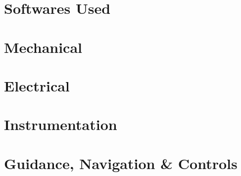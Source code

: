 \section{Softwares Used}
\thispagestyle{fancy}

\section*{Mechanical}
\blindtext

\section*{Electrical}
\blindtext

\section*{Instrumentation}
\blindtext

\section*{Guidance, Navigation \& Controls}
\blindtext
